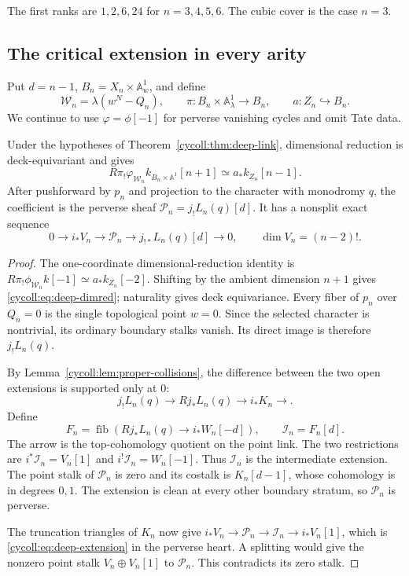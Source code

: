 The first ranks are $1,2,6,24$ for $n=3,4,5,6$.
The cubic cover is the case $n=3$.

\subsection{The critical extension in every arity}

Put $d=n-1$, $B_n=X_n\times\mathbb A^1_w$, and define
\[
 \mathcal W_n=\lambda(w^N-Q_n),\qquad
 \pi:B_n\times\mathbb A^1_\lambda\longrightarrow B_n,
 \qquad a:Z_n\hookrightarrow B_n.
\]
We continue to use $\varphi=\phi[-1]$ for perverse
vanishing cycles and omit Tate data.

\begin{theorem}\label{cycoll:thm:deep-critical}
Under the hypotheses of Theorem~\ref{cycoll:thm:deep-link},
dimensional reduction is deck-equivariant and gives
\begin{equation}\label{cycoll:eq:deep-dimred}
 R\pi_!\varphi_{\mathcal W_n}
       k_{B_n\times\mathbb A^1}[n+1]
       \simeq a_*k_{Z_n}[n-1].
\end{equation}
After pushforward by $p_n$ and projection to the character
with monodromy $q$, the coefficient is the perverse sheaf
$\mathcal P_n=j_!L_n(q)[d]$. It has a nonsplit exact sequence
\begin{equation}\label{cycoll:eq:deep-extension}
 0\longrightarrow i_*V_n\longrightarrow\mathcal P_n
       \longrightarrow j_{!*}L_n(q)[d]\longrightarrow0,
 \qquad \dim V_n=(n-2)!.
\end{equation}
\end{theorem}
\begin{proof}
The one-coordinate dimensional-reduction identity is
$R\pi_!\phi_{\mathcal W_n}k[-1]\simeq a_*k_{Z_n}[-2]$.
Shifting by the ambient dimension $n+1$ gives
\eqref{cycoll:eq:deep-dimred}; naturality gives deck
equivariance. Every fiber of $p_n$ over $Q_n=0$ is the
single topological point $w=0$. Since the selected
character is nontrivial, its ordinary boundary stalks
vanish. Its direct image is therefore $j_!L_n(q)$.

By Lemma~\ref{cycoll:lem:proper-collisions}, the difference
between the two open extensions is supported only at $0$:
\[
 j_!L_n(q)\longrightarrow Rj_*L_n(q)
       \longrightarrow i_*K_n\longrightarrow.
\]
Define
\[
 F_n=\operatorname{fib}\left(Rj_*L_n(q)
           \longrightarrow i_*W_n[-d]\right),\qquad
 \mathcal I_n=F_n[d].
\]
The arrow is the top-cohomology quotient on the point link.
The two restrictions are
$i^*\mathcal I_n=V_n[1]$ and
$i^!\mathcal I_n=W_n[-1]$.
Thus $\mathcal I_n$ is the intermediate extension.
The point stalk of $\mathcal P_n$ is zero and its costalk
is $K_n[d-1]$, whose cohomology is in degrees $0,1$.
The extension is clean at every other boundary stratum,
so $\mathcal P_n$ is perverse.

The truncation triangles of $K_n$ now give
$i_*V_n\to\mathcal P_n\to\mathcal I_n\to i_*V_n[1]$,
which is \eqref{cycoll:eq:deep-extension} in the perverse
heart. A splitting would give the nonzero point stalk
$V_n\oplus V_n[1]$ to $\mathcal P_n$. This contradicts
its zero stalk.
\end{proof}

